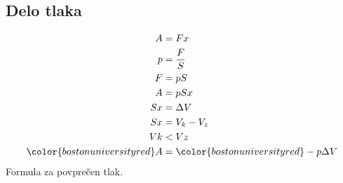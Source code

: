 {\color{indiagreen}\subsection{Delo tlaka}}
\begin{align*}
	A &= Fx\\
	p &= \frac{F}{S}\\
	F &= pS\\
	A &= pSx\\
	Sx &= \Delta V\\
	Sx &= V_k - V_z\\
	Vk &< Vz\\
	{\color{bostonuniversityred}A} &= {\color{bostonuniversityred}-p\Delta V}
\end{align*}
Formula za povprečen tlak.